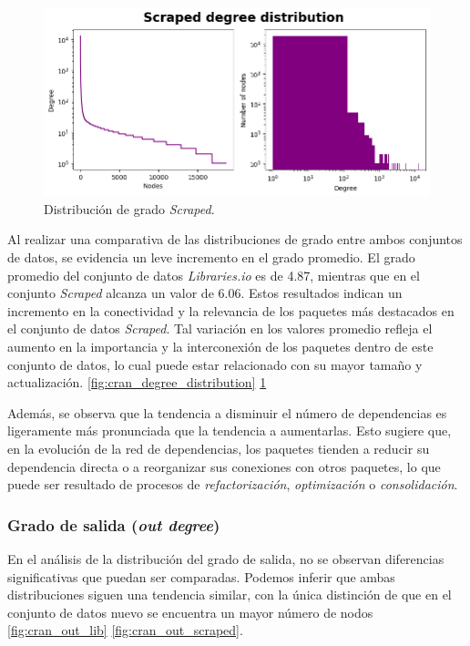 \begin{figure}[ht!]
    \begin{center}
        \includegraphics[width=1\textwidth]{img/cran/distribucion_grado2.png}
        \caption{Distribución de grado \textit{Scraped}.}
        \label{fig:cran_degree_distribution_scraped}
    \end{center}
\end{figure}

Al realizar una comparativa de las distribuciones de grado entre ambos conjuntos de datos,
se evidencia un leve incremento en el grado promedio. El grado promedio del conjunto de datos
\textit{Libraries.io} es de 4.87, mientras que en el conjunto \textit{Scraped} alcanza un valor
de 6.06. Estos resultados indican un incremento en la conectividad y la relevancia de los
paquetes más destacados en el conjunto de datos \textit{Scraped}. Tal variación en los valores
promedio refleja el aumento en la importancia y la interconexión de los paquetes dentro de este
conjunto de datos, lo cual puede estar relacionado con su mayor tamaño y actualización.
\ref{fig:cran_degree_distribution} \ref{fig:cran_degree_distribution_scraped}

Además, se observa que la tendencia a disminuir el número de dependencias es ligeramente
más pronunciada que la tendencia a aumentarlas. Esto sugiere que, en la evolución de
la red de dependencias, los paquetes tienden a reducir su dependencia directa o a
reorganizar sus conexiones con otros paquetes, lo que puede ser resultado de procesos
de \textit{refactorización}, \textit{optimización} o \textit{consolidación}.


\subsubsection{Grado de salida (\textit{out degree})}


En el análisis de la distribución del grado de salida, no se observan diferencias significativas
que puedan ser comparadas. Podemos inferir que ambas distribuciones siguen una tendencia
similar, con la única distinción de que en el conjunto de datos nuevo se encuentra un mayor
número de nodos \ref{fig:cran_out_lib} \ref{fig:cran_out_scraped}.

